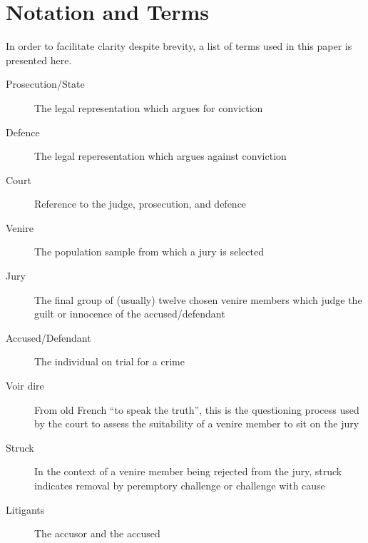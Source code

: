 \chapter*{Notation and Terms}
\label{c:Notation}

In order to facilitate clarity despite brevity, a list of terms used in this paper is presented here.

\begin{description}
\item[Prosecution/State] The legal representation which argues for conviction
\item[Defence] The legal reperesentation which argues against conviction
\item[Court] Reference to the judge, prosecution, and defence
\item[Venire] The population sample from which a jury is selected
\item[Jury] The final group of (usually) twelve chosen venire members which judge the guilt or innocence of the
    accused/defendant
\item[Accused/Defendant] The individual on trial for a crime
\item[Voir dire] From old French ``to speak the truth'', this is the questioning process used by the court to assess the
  suitability of a venire member to sit on the jury
\item[Struck] In the context of a venire member being rejected from the jury, struck indicates removal by peremptory challenge or
  challenge with cause
\item[Litigants] The accusor and the accused
\end{description}


